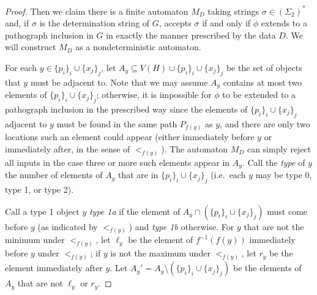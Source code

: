 \documentclass{article}
\begin{document}
\begin{proof}
Then we claim there is a finite automaton $M_D$ taking strings $\sigma\in (\Sigma_2)^*$ and, if $\sigma$ is the determination string of $G$, accepts $\sigma$ if and only if $\phi$ extends to a pathograph inclusion in $G$ in exactly the manner prescribed by the data $D$. We will construct $M_D$ as a nondeterministic automaton.

For each $y\in \{p_i\}_i\cup \{x_j\}_j$, let $A_y\subseteq V(H)\cup \{p_i\}_i\cup \{x_j\}_j$ be the set of objects that $y$ must be adjacent to. Note that we may assume $A_y$ contains at most two elements of $\{p_i\}_i\cup \{x_j\}_j$; otherwise, it is impossible for $\phi$ to be extended to a pathograph inclusion in the prescribed way since the elements of $\{p_i\}_i\cup \{x_j\}_j$ adjacent to $y$ must be found in the same path $P_{f(y)}$ as $y$, and there are only two locations such an element could appear (either immediately before $y$ or immediately after, in the sense of $<_{f(y)}$). The automaton $M_D$ can simply reject all inputs in the case three or more such elements appear in $A_y$. Call the \textit{type} of $y$ the number of elements of $A_y$ that are in $\{p_i\}_i\cup \{x_j\}_j$ (i.e.\ each $y$ may be type 0, type 1, or type 2).

Call a type 1 object $y$ \textit{type 1a} if the element of $A_y\cap (\{p_i\}_i\cup \{x_j\}_j)$ must come before $y$ (as indicated by $<_{f(y)}$) and \textit{type 1b} otherwise. For $y$ that are not the minimum under $<_{f(y)}$, let $\ell_y$ be the element of $f^{-1}(f(y))$ immediately before $y$ under $<_{f(y)}$; if $y$ is not the maximum under $<_{f(y)}$, let $r_y$ be the element immediately after $y$. Let $A_y'=A_y\setminus (\{p_i\}_i\cup \{x_j\}_j)$ be the elements of $A_y$ that are not $\ell_y$ or $r_y$.


\end{proof}
\end{document}

